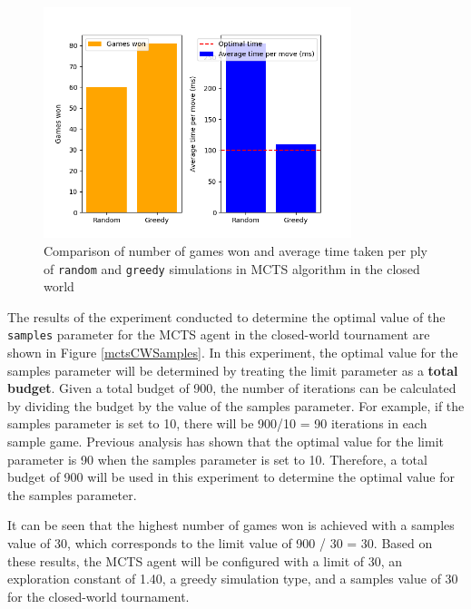 \begin{figure}[h]
  \centering
  \captionsetup{justification=centering}
  \includegraphics[width=0.8\textwidth]{../img/mcts_simulation_closedworld.png}
  \caption{Comparison of number of games won and average time taken per ply of \texttt{random} and \texttt{greedy} simulations in MCTS algorithm in the closed world}
  \label{mctsCWSimulations}
\end{figure}

The results of the experiment conducted to determine the optimal value of the \texttt{samples} parameter for the MCTS agent in the closed-world tournament are shown in Figure \ref{mctsCWSamples}. In this experiment, the optimal value for the samples parameter will be determined by treating the limit parameter as a \textbf{total budget}. Given a total budget of 900, the number of iterations can be calculated by dividing the budget by the value of the samples parameter. For example, if the samples parameter is set to 10, there will be 900/10 = 90 iterations in each sample game. Previous analysis has shown that the optimal value for the limit parameter is 90 when the samples parameter is set to 10. Therefore, a total budget of 900 will be used in this experiment to determine the optimal value for the samples parameter.

It can be seen that the highest number of games won is achieved with a samples value of 30, which corresponds to the limit value of 900 / 30 = 30. Based on these results, the MCTS agent will be configured with a limit of 30, an exploration constant of 1.40, a greedy simulation type, and a samples value of 30 for the closed-world tournament.

